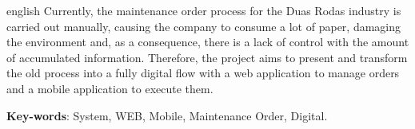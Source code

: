 \begin{resumo}[Abstract]
	\begin{otherlanguage*}{english}
		Currently, the maintenance order process for the Duas Rodas industry is carried out manually, causing the company to consume a lot of paper, damaging the environment and, as a consequence, there is a lack of control with the amount of accumulated information. Therefore, the project aims to present and transform the old process into a fully digital flow with a web application to manage orders and a mobile application to execute them.
		
		\vspace{\onelineskip}
		
		\noindent 
		\textbf{Key-words}: System, WEB, Mobile, Maintenance Order, Digital.
	\end{otherlanguage*}
\end{resumo}


\listoffigures*
\cleardoublepage

